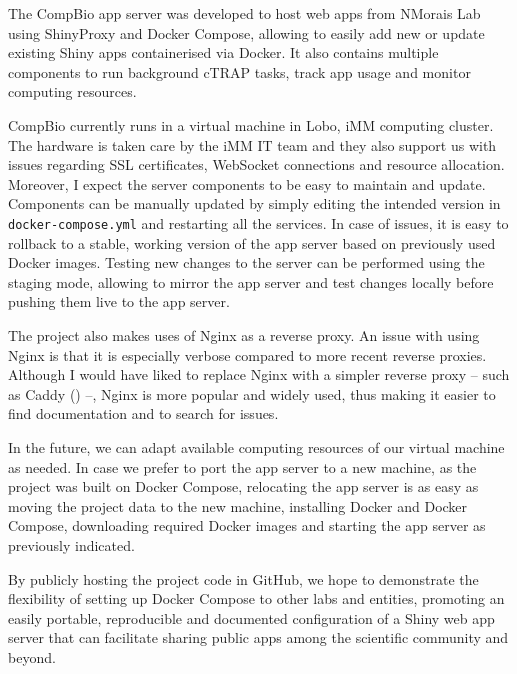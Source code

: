 The CompBio app server was developed to host web apps from NMorais Lab using ShinyProxy and Docker Compose, allowing to easily add new or update existing Shiny apps containerised via Docker. It also contains multiple components to run background cTRAP tasks, track app usage and monitor computing resources.

CompBio currently runs in a virtual machine in Lobo, iMM computing cluster. The hardware is taken care by the iMM IT team and they also support us with issues regarding SSL certificates, WebSocket connections and resource allocation. Moreover, I expect the server components to be easy to maintain and update. Components can be manually updated by simply editing the intended version in \texttt{docker-compose.yml} and restarting all the services. In case of issues, it is easy to rollback to a stable, working version of the app server based on previously used Docker images. Testing new changes to the server can be performed using the staging mode, allowing to mirror the app server and test changes locally before pushing them live to the app server.

The project also makes uses of Nginx as a reverse proxy. An issue with using Nginx is that it is especially verbose compared to more recent reverse proxies. Although I would have liked to replace Nginx with a simpler reverse proxy -- such as Caddy () --, Nginx is more popular and widely used, thus making it easier to find documentation and to search for issues.

In the future, we can adapt available computing resources of our virtual machine as needed. In case we prefer to port the app server to a new machine, as the project was built on Docker Compose, relocating the app server is as easy as moving the project data to the new machine, installing Docker and Docker Compose, downloading required Docker images and starting the app server as previously indicated.

By publicly hosting the project code in GitHub, we hope to demonstrate the flexibility of setting up Docker Compose to other labs and entities, promoting an easily portable, reproducible and documented configuration of a Shiny web app server that can facilitate sharing public apps among the scientific community and beyond.
